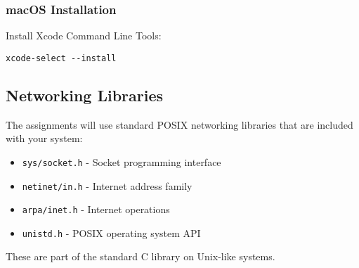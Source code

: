 \subsubsection{macOS Installation}

Install Xcode Command Line Tools:
\begin{verbatim}
xcode-select --install
\end{verbatim}

\subsection{Networking Libraries}

The assignments will use standard POSIX networking libraries that are included with your system:
\begin{itemize}
    \item \texttt{sys/socket.h} - Socket programming interface
    \item \texttt{netinet/in.h} - Internet address family
    \item \texttt{arpa/inet.h} - Internet operations
    \item \texttt{unistd.h} - POSIX operating system API
\end{itemize}

\begin{noteblock}
These are part of the standard C library on Unix-like systems.
\end{noteblock}